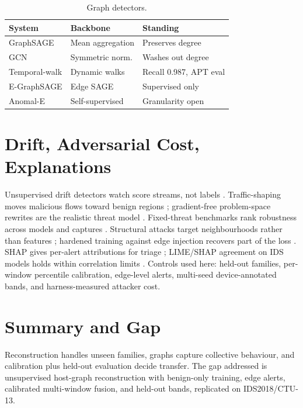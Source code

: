 \documentclass[conference]{IEEEtran}
\begin{document}
\begin{table}[htbp]
\caption{Graph detectors.}
\label{tab:graphs}
\centering
\begin{tabular}{@{}lll@{}}
\toprule
System & Backbone & Standing \\
\midrule
GraphSAGE \cite{hamilton2017} & Mean aggregation & Preserves degree \\
GCN \cite{kipf2017} & Symmetric norm. & Washes out degree \\
Temporal-walk \cite{paudel2022} & Dynamic walks & Recall 0.987, APT eval \\
E-GraphSAGE \cite{lo2022} & Edge SAGE & Supervised only \\
Anomal-E \cite{caville2022} & Self-supervised & Granularity open \\
\bottomrule
\end{tabular}
\end{table}

\section{Drift, Adversarial Cost, Explanations}
Unsupervised drift detectors watch score streams, not labels \cite{gama2014}. Traffic-shaping moves malicious flows toward benign regions \cite{debar1999,bhuyan2014}; gradient-free problem-space rewrites are the realistic threat model \cite{apruzzese2023}. Fixed-threat benchmarks rank robustness across models and captures \cite{vitorino2023}. Structural attacks target neighbourhoods rather than features \cite{paudel2022,lo2022,caville2022,wang2025}; hardened training against edge injection recovers part of the loss \cite{galli2025}. SHAP gives per-alert attributions for triage \cite{lundberg2017}; LIME/SHAP agreement on IDS models holds within correlation limits \cite{gaspar2024}. Controls used here: held-out families, per-window percentile calibration, edge-level alerts, multi-seed device-annotated bands, and harness-measured attacker cost.

\section{Summary and Gap}
Reconstruction handles unseen families, graphs capture collective behaviour, and calibration plus held-out evaluation decide transfer. The gap addressed is unsupervised host-graph reconstruction with benign-only training, edge alerts, calibrated multi-window fusion, and held-out bands, replicated on IDS2018/CTU-13.
\end{document}
